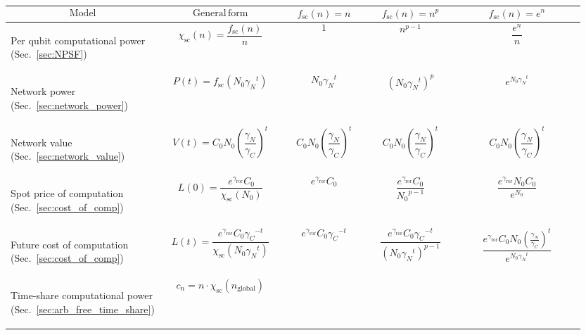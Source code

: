 \begin{table}[!htbp]
{\footnotesize
\begin{tabular}{|m{0.21\linewidth}|m{0.21\linewidth}|m{0.15\linewidth}|m{0.155\linewidth}|m{0.225\linewidth}|}
	\hline
	\[\mathrm{Model}\] & \[\mathrm{General\, form}\] & \[f_\mathrm{sc}(n)=n\] & \[f_\mathrm{sc}(n)=n^p\] & \[f_\mathrm{sc}(n)=e^n\]\\
	\hline \hline
	\begin{flushleft}Per qubit computational power (Sec.~\ref{sec:NPSF})\end{flushleft} & \[\chi_\mathrm{sc}(n)=\frac{f_\mathrm{sc}(n)}{n}\] & \[1\] & \[n^{p-1}\] & \[\frac{e^n}{n}\]\\
	\hline
	\begin{flushleft}Network power (Sec.~\ref{sec:network_power})\end{flushleft} & \[P(t)=f_\mathrm{sc}(N_0{\gamma_N}^t)\] & \[N_0{\gamma_N}^t\] & \[\left(N_0{\gamma_N}^t\right)^p\] & \[ e^{N_0{\gamma_N}^t}\] \\
	\hline
	\begin{flushleft}Network value (Sec.~\ref{sec:network_value})\end{flushleft} & \[V(t)=C_0 N_0 \left(\frac{\gamma_N}{\gamma_C}\right)^t\] & \[C_0 N_0 \left(\frac{\gamma_N}{\gamma_C}\right)^t\] & \[C_0 N_0 \left(\frac{\gamma_N}{\gamma_C}\right)^t\] & \[C_0 N_0 \left(\frac{\gamma_N}{\gamma_C}\right)^t\] \\
	\hline
	\begin{flushleft}Spot price of computation (Sec.~\ref{sec:cost_of_comp})\end{flushleft} & \[L(0)=\frac{e^{\gamma_\mathrm{ror}} C_0}{\chi_\mathrm{sc}(N_0)}\] & \[e^{\gamma_\mathrm{ror}} C_0\] &  \[\frac{e^{\gamma_\mathrm{ror}}C_0}{{N_0}^{p-1}}\] & \[\frac{e^{\gamma_\mathrm{ror}}N_0C_0}{e^{N_0}}\] \\
	\hline
	\begin{flushleft}Future cost of computation (Sec.~\ref{sec:cost_of_comp})\end{flushleft} & \[L(t)=\frac{e^{\gamma_\mathrm{ror}} C_0{\gamma_C}^{-t}}{\chi_\mathrm{sc}(N_0 {\gamma_N}^t)}
\] & \[e^{\gamma_\mathrm{ror}} C_0{\gamma_C}^{-t} \] & \[ \frac{e^{\gamma_\mathrm{ror}} C_0{\gamma_C}^{-t}}{(N_0 {\gamma_N}^t)^{p-1}}
\] & \[ \frac{e^{\gamma_\mathrm{ror}} C_0N_0 \left(\frac{\gamma_N}{\gamma_C}\right)^t}{e^{N_0 {\gamma_N}^t}}\] \\
	\hline
	\begin{flushleft}Time-share computational power (Sec.~\ref{sec:arb_free_time_share})\end{flushleft} & \[c_n=n \cdot \chi_\mathrm{sc}(n_\mathrm{global})
\]
\end{tabular}}
\end{table}
